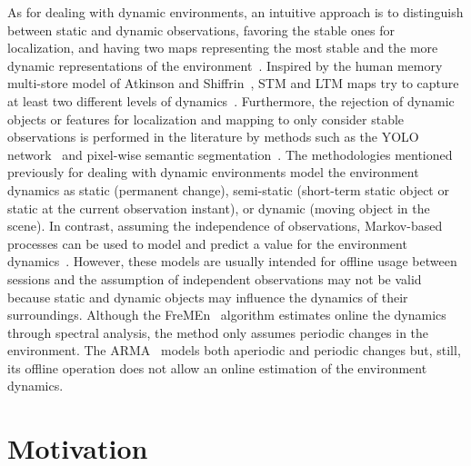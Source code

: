 As for dealing with dynamic environments, an intuitive approach is to distinguish between static and dynamic observations, favoring the stable ones for localization, and having two maps representing the most stable and the more dynamic representations of the environment~\cite{walcott-bryant-et-al:2012:6385561,wang-et-al:2019:8793499,zhu-et-al:2021:9561584}.
Inspired by the human memory multi-store model of Atkinson and Shiffrin~\cite{discussion:atkinson:stm+ltm}, \gls{STM} and \gls{LTM} maps try to capture at least two different levels of dynamics~\cite{biber-duckett:2009:0278364908096286,dayoub-et-al:2011:013,bacca-et-al:2013:003}.
Furthermore, the rejection of dynamic objects or features for localization and mapping to only consider stable observations is performed in the literature by methods such as the YOLO network~\cite{yue-et-al:2020:9197072,zhu-et-al:2021:9561584} and pixel-wise semantic segmentation~\cite{singh-et-al:2021:9564866,song-et-al:2019:8967749,ganti-waslander:2019:00024}.
The methodologies mentioned previously for dealing with dynamic environments model the environment dynamics as static (permanent change), semi-static (short-term static object or static at the current observation instant), or dynamic (moving object in the scene).
In contrast, assuming the independence of observations, Markov-based processes can be used to model and predict a value for the environment dynamics~\cite{tipaldi-et-al:2013:0278364913502830,rapp-et-al:2015:77}. However, these models are usually intended for offline usage between sessions and the assumption of independent observations may not be valid because static and dynamic objects may influence the dynamics of their surroundings.
Although the \gls{FreMEn}~\cite{krajník-et-al:2017:2665664} algorithm estimates online the dynamics through spectral analysis, the method only assumes periodic changes in the environment.
The \gls{ARMA}~\parencite{wang-et-al:2020:9468884} models both aperiodic and periodic changes but, still, its offline operation does not allow an online estimation of the environment dynamics.






\section{Motivation}\label{sec:motivation}

